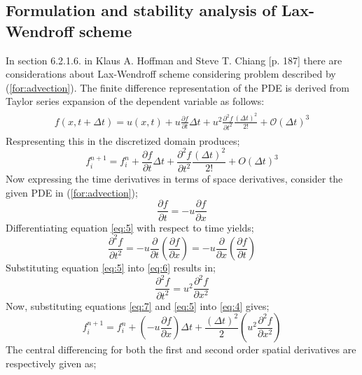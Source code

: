 \subsection{Formulation and stability analysis of Lax-Wendroff scheme}
	In section 6.2.1.6. in Klaus A. Hoffman and Steve T. Chiang \cite{bib:hoffman}[p. 187] there are considerations about Lax-Wendroff scheme considering problem described by (\ref{for:advection}). The finite difference representation of the PDE is derived from Taylor series expansion of the dependent variable as follows: 	
	\begin{align}
		\begin{split}
			f(x, t + \Delta t) = u(x, t) + u\frac{\partial f}{\partial t}\Delta t + u^2\frac{\partial ^2 f}{\partial t^2}\frac{(\Delta t)^2}{2!} + \mathcal{O}(\Delta t)^3
		\end{split}
	\end{align}	
	Respresenting this in the discretized domain produces;
	\begin{equation}
		f^{n+1}_{i} = f^{n}_{i} + \frac{\partial f}{\partial t}\Delta t + \frac{\partial^2 f}{\partial t^2}\frac{(\Delta t)^2}{2!} + O(\Delta t)^3 \label{eq:4}
	\end{equation}
	Now expressing the time derivatives in terms of space derivatives, consider the given PDE in (\ref{for:advection});
	\begin{equation}
		\frac{\partial f}{\partial t} = - u \frac{\partial f}{\partial x} \label{eq:5}
	\end{equation}
	Differentiating equation \eqref{eq:5} with respect to time yields;
	\begin{equation}
		\frac{\partial^2 f}{\partial t^2} = -u\frac{\partial}{\partial t}\left(\frac{\partial f}{\partial x}\right) = -u\frac{\partial}{\partial x}\left(\frac{\partial f}{\partial t}\right) \label{eq:6}
	\end{equation}
	Substituting equation \eqref{eq:5} into \eqref{eq:6} results in;
	\begin{equation}
		\frac{\partial^2 f}{\partial t^2} = u^2\frac{\partial^2 f}{\partial x^2} \label{eq:7}
	\end{equation}
	Now, substituting equations \eqref{eq:7} and \eqref{eq:5} into \eqref{eq:4} gives;
	\begin{equation}
		f^{n+1}_{i} = f^{n}_{i} + \left(- u \frac{\partial f}{\partial x}\right) \Delta t + \frac{(\Delta t)^2}{2}\left(u^2\frac{\partial^2 f}{\partial x^2}\right) \label{eq:8}
	\end{equation}
	The central differencing for both the first and second order spatial derivatives are respectively given as;
